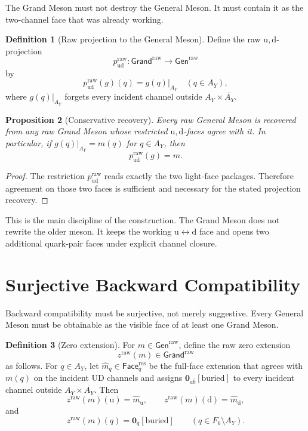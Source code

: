 \documentclass[11pt]{article}
\theoremstyle{definition}
\newtheorem{definition}{Definition}
\theoremstyle{plain}
\newtheorem{proposition}[definition]{Proposition}
\newcommand{\qu}{\mathrm u}
\newcommand{\qd}{\mathrm d}
\begin{document}
The Grand Meson must not destroy the General Meson.  It must contain it as
the two-channel face that was already working.

\begin{definition}[Raw projection to the General Meson]
Define the raw \(\qu,\qd\)-projection
\[
  p^{\mathrm{raw}}_{\qu\qd}:
  \mathsf{Grand}^{\mathrm{raw}}\to\mathsf{Gen}^{\mathrm{raw}}
\]
by
\[
  p^{\mathrm{raw}}_{\qu\qd}(g)(q)=g(q)|_{A_Y}
  \quad(q\in A_Y),
\]
where \(g(q)|_{A_Y}\) forgets every incident channel outside
\(A_Y\times\overline{A_Y}\).
\end{definition}

\begin{proposition}[Conservative recovery]
Every raw General Meson is recovered from any raw Grand Meson whose restricted
\(\qu,\qd\)-faces agree with it.  In particular, if
\(g(q)|_{A_Y}=m(q)\) for \(q\in A_Y\), then
\[
  p^{\mathrm{raw}}_{\qu\qd}(g)=m.
\]
\end{proposition}

\begin{proof}
The restriction \(p^{\mathrm{raw}}_{\qu\qd}\) reads exactly the two
light-face packages.
Therefore agreement on those two faces is sufficient and necessary for the
stated projection recovery.
\end{proof}

This is the main discipline of the construction.  The Grand Meson does not
rewrite the older meson.  It keeps the working \(\qu\leftrightarrow\qd\)
face and opens two additional quark-pair faces under explicit channel
closure.

\section{Surjective Backward Compatibility}

Backward compatibility must be surjective, not merely suggestive.  Every
General Meson must be obtainable as the visible face of at least one Grand
Meson.

\begin{definition}[Zero extension]
For \(m\in\mathsf{Gen}^{\mathrm{raw}}\), define the raw zero extension
\[
  z^{\mathrm{raw}}(m)\in\mathsf{Grand}^{\mathrm{raw}}
\]
as follows.  For \(q\in A_Y\), let \(\widehat m_q\in
\mathsf{Face}^{\mathrm{res}}_q\) be the full-face extension that agrees
with \(m(q)\) on the incident UD channels and assigns
\(\mathbf 0_{a\bar b}[\mathrm{buried}]\) to every incident channel
outside \(A_Y\times\overline{A_Y}\).  Then
\[
  z^{\mathrm{raw}}(m)(\qu)=\widehat m_{\qu},\qquad
  z^{\mathrm{raw}}(m)(\qd)=\widehat m_{\qd},
\]
and
\[
  z^{\mathrm{raw}}(m)(q)=\mathbf 0_q[\mathrm{buried}]
  \qquad(q\in F_6\setminus A_Y).
\]
\end{definition}
\end{document}
